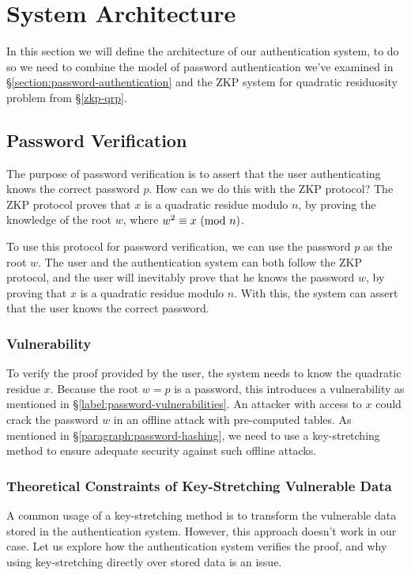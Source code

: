 

\section{System Architecture}
\label{label:protocol-design}
In this section we will define the architecture of our authentication system, to do so we need to combine the model of password authentication we've examined in \S\ref{section:password-authentication} and the ZKP system for quadratic residuosity problem from \S\ref{zkp-qrp}.

\subsection{Password Verification}
\label{section:zkp-password-verification}
The purpose of password verification is to assert that the user authenticating knows the correct password $p$. 
How can we do this with the ZKP protocol?
The ZKP protocol proves that $x$ is a quadratic residue modulo $n$, by proving the knowledge of the root $w$, where  $w^2 \equiv x \ (\mathrm{mod}\ n)$.

To use this protocol for password verification, we can use the password $p$ as the root $w$. The user and the authentication system can both follow the ZKP protocol, and the user will inevitably prove that he knows the password $w$, by proving that $x$ is a quadratic residue modulo $n$. With this, the system can assert that the user knows the correct password.

\subsubsection{Vulnerability}
To verify the proof provided by the user, the system needs to know the quadratic residue $x$.
Because the root $w = p$ is a password, this introduces a vulnerability as mentioned in \S\ref{label:password-vulnerabilities}.
An attacker with access to $x$ could crack the password $w$ in an offline attack with pre-computed tables.
As mentioned in \S\ref{paragraph:password-hashing}, we need to use a key-stretching method to ensure adequate security against such offline attacks.

\subsubsection{Theoretical Constraints of Key-Stretching Vulnerable Data}
A common usage of a key-stretching method is to transform the vulnerable data stored in the authentication system.
However, this approach doesn't work in our case.
Let us explore how the authentication system verifies the proof, and why using key-stretching directly over stored data is an issue.

